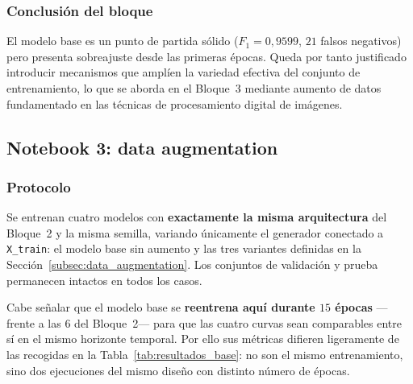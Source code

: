 \documentclass[11pt, a4paper]{article}
\numberwithin{equation}{section}
\begin{document}
\subsubsection{Conclusión del bloque}

El modelo base es un punto de partida sólido ($F_1 = 0{,}9599$, $21$ falsos negativos)
pero presenta sobreajuste desde las primeras épocas. Queda por tanto justificado
introducir mecanismos que amplíen la variedad efectiva del conjunto de entrenamiento,
lo que se aborda en el Bloque~3 mediante aumento de datos fundamentado en las técnicas
de procesamiento digital de imágenes.
\newpage
\subsection{Notebook 3: data augmentation}
\label{subsec:exp_notebook3}

\subsubsection{Protocolo}

Se entrenan cuatro modelos con \textbf{exactamente la misma arquitectura} del
Bloque~2 y la misma semilla, variando únicamente el generador conectado a
\texttt{X\_train}: el modelo base sin aumento y las tres variantes definidas en la Sección~\ref{subsec:data_augmentation}. Los conjuntos de validación y prueba
permanecen intactos en todos los casos.

Cabe señalar que el modelo base se \textbf{reentrena aquí durante $15$ épocas}
---frente a las $6$ del Bloque~2--- para que las cuatro curvas sean comparables entre
sí en el mismo horizonte temporal. Por ello sus métricas difieren ligeramente de las
recogidas en la Tabla~\ref{tab:resultados_base}: no son el mismo entrenamiento, sino
dos ejecuciones del mismo diseño con distinto número de épocas.



\end{document}
